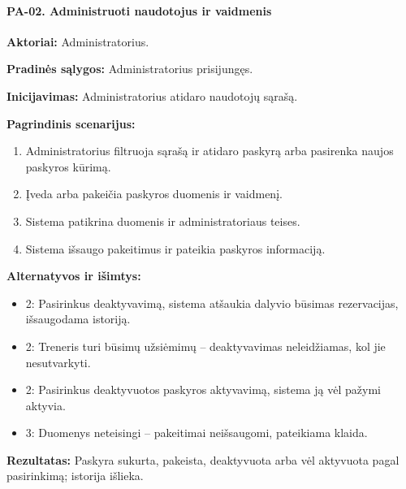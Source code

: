 \paragraph{PA-02. Administruoti naudotojus ir vaidmenis}\mbox{}\par
\textbf{Aktoriai:} Administratorius.\par
\textbf{Pradinės sąlygos:} Administratorius prisijungęs.\par
\textbf{Inicijavimas:} Administratorius atidaro naudotojų sąrašą.\par
\textbf{Pagrindinis scenarijus:}
\begin{enumerate}
\item Administratorius filtruoja sąrašą ir atidaro paskyrą arba pasirenka naujos paskyros kūrimą.
\item Įveda arba pakeičia paskyros duomenis ir vaidmenį.
\item Sistema patikrina duomenis ir administratoriaus teises.
\item Sistema išsaugo pakeitimus ir pateikia paskyros informaciją.
\end{enumerate}
\textbf{Alternatyvos ir išimtys:}
\begin{itemize}
\item 2: Pasirinkus deaktyvavimą, sistema atšaukia dalyvio būsimas rezervacijas, išsaugodama istoriją.
\item 2: Treneris turi būsimų užsiėmimų -- deaktyvavimas neleidžiamas, kol jie nesutvarkyti.
\item 2: Pasirinkus deaktyvuotos paskyros aktyvavimą, sistema ją vėl pažymi aktyvia.
\item 3: Duomenys neteisingi -- pakeitimai neišsaugomi, pateikiama klaida.
\end{itemize}
\textbf{Rezultatas:} Paskyra sukurta, pakeista, deaktyvuota arba vėl aktyvuota pagal pasirinkimą; istorija išlieka.\par
{}
